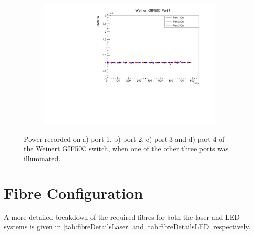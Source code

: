 \documentclass[a4paper,11pt]{article}
\begin{document}
\begin{figure}[h!]
\begin{subfigure}{0.5\textwidth}
\subcaption{}\label{fig:weingifcrosstalkport3}
\end{subfigure}%
\begin{subfigure}{0.5\textwidth}
\includegraphics[width=\linewidth]{WeinertGIF50CPort4.pdf}
\subcaption{}\label{fig:weingifcrosstalkport4}
\end{subfigure}
\caption{Power recorded on a) port 1, b) port 2, c) port 3 and d) port 4 of the Weinert GIF50C switch, when one of the other three ports was illuminated.}\label{fig:weingifcrosstalk2}
\end{figure}

\clearpage
\newpage

\section{Fibre Configuration}\label{app:fibreconfig}

A more detailed breakdown of the required fibres for both the laser and LED systems is given in \cref{tab:fibreDetailsLaser} and \cref{tab:fibreDetailsLED} respectively.
\end{document}
